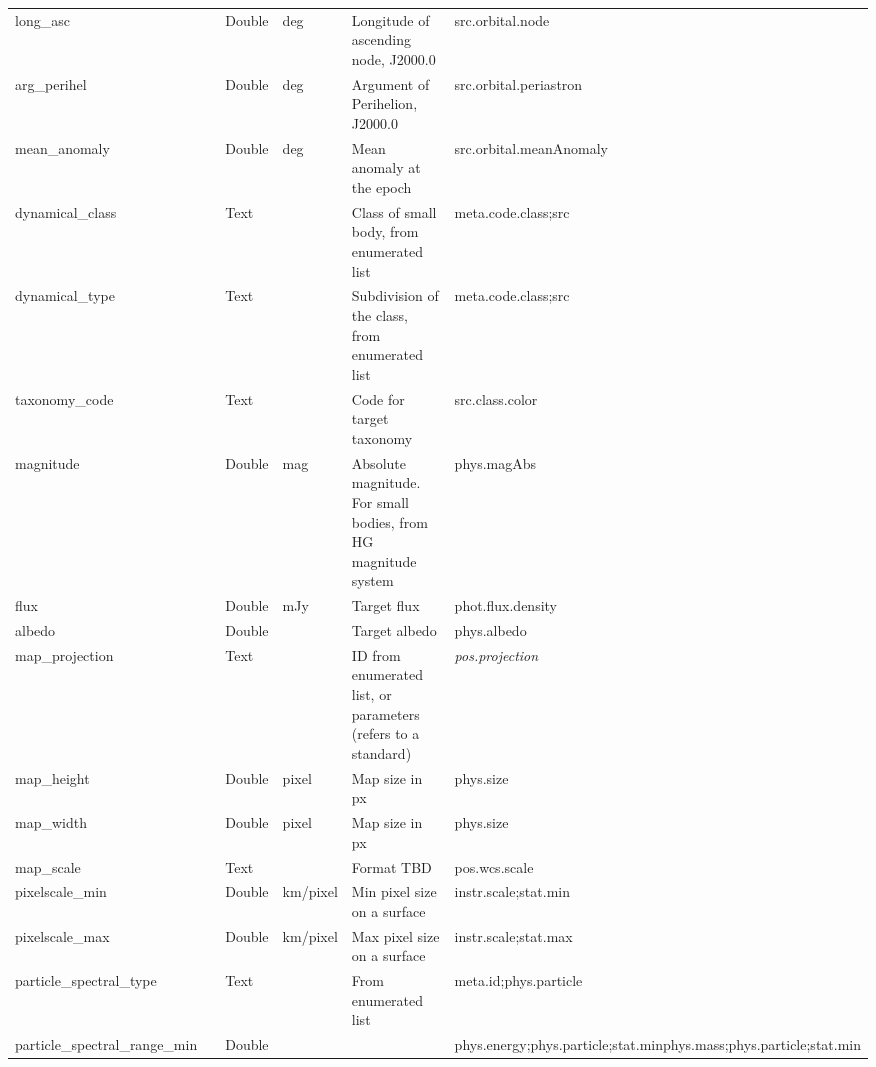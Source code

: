 \documentclass[11pt,a4paper]{ivoa}
\begin{document}
\begin{longtable}{p{3.5cm}p{0.5cm}p{1cm}p{1cm}p{7cm}p{3cm}}
long\_asc&&Double&deg&Longitude of ascending node, J2000.0&src.orbital.node\\

arg\_perihel&&Double&deg&Argument of Perihelion, J2000.0&src.orbital.periastron\\

mean\_anomaly&&Double&deg&Mean anomaly at the epoch&src.orbital.meanAnomaly\\

dynamical\_class&&Text&&Class of small body, from enumerated list&meta.code.class;src\\

dynamical\_type&&Text&&Subdivision of the class, from enumerated list&meta.code.class;src\\

taxonomy\_code&&Text&&Code for target taxonomy&src.class.color\\

magnitude&&Double&mag&Absolute magnitude. For small bodies, from HG magnitude system&phys.magAbs\\

flux&&Double&mJy&Target flux&phot.flux.density\\

albedo&&Double&&Target albedo&phys.albedo\\

map\_projection&&Text&&ID from enumerated list, or parameters (refers to a standard)&\emph{pos.projection}\\

map\_height&&Double&pixel&Map size in px&phys.size\\

map\_width&&Double&pixel&Map size in px&phys.size\\

map\_scale&&Text&&Format TBD&pos.wcs.scale\\

pixelscale\_min&&Double&km/pixel&Min pixel size on a surface&instr.scale;stat.min\\

pixelscale\_max&&Double&km/pixel&Max pixel size on a surface&instr.scale;stat.max\\

particle\_spectral\_type&&Text&&From enumerated list&meta.id;phys.particle\\

particle\_spectral\_range\_min&&Double&&&phys.energy;phys.particle;stat.minphys.mass;phys.particle;stat.min\\


\end{longtable}
\end{document}
